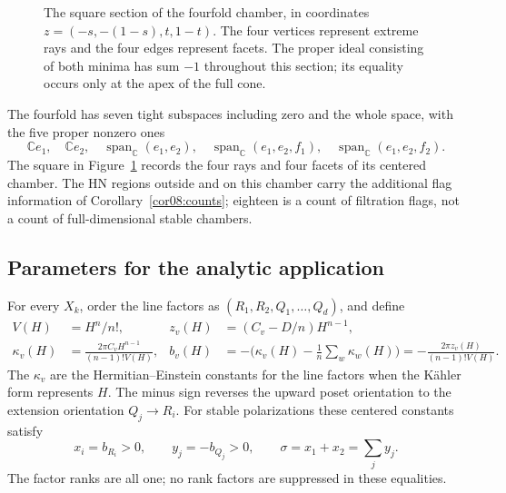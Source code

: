 \documentclass[11pt]{amsart}
\theoremstyle{definition}
\theoremstyle{remark}
\newcommand{\CC}{\mathbb C}
\newcommand{\spanC}{\operatorname{span}_{\CC}}
\begin{document}
\begin{figure}[htbp]
\centering
{}
\caption{The square section of the fourfold chamber, in coordinates
\(z=(-s,-(1-s),t,1-t)\). The four vertices represent extreme rays
and the four edges represent facets. The proper ideal consisting of
both minima has sum \(-1\) throughout this section; its equality
occurs only at the apex of the full cone.}
\label{fig09:square}
\end{figure}


The fourfold has seven tight subspaces including zero and the whole
space, with the five proper nonzero ones
\[
 \CC e_1,\quad\CC e_2,\quad
 \spanC(e_1,e_2),\quad
 \spanC(e_1,e_2,f_1),\quad\spanC(e_1,e_2,f_2).
\]
The square in Figure~\ref{fig09:square} records the four rays and
four facets of its centered chamber. The HN regions outside and on
this chamber carry the additional flag information of
Corollary~\ref{cor08:counts}; eighteen is a count of filtration
flags, not a count of full-dimensional stable chambers.

\subsection*{Parameters for the analytic application}
For every \(X_k\), order the line factors as
\((R_1,R_2,Q_1,\ldots,Q_d)\), and define
\begin{equation}\label{eq09:demands}
 \begin{aligned}
 V(H)&=H^n/n!,&
 z_v(H)&=(C_v-D/n)H^{n-1},\\
 \kappa_v(H)&=\frac{2\pi C_vH^{n-1}}{(n-1)!V(H)},&
 b_v(H)&=-\biggl(\kappa_v(H)-\frac1n\sum_w\kappa_w(H)\biggr)
       =-\frac{2\pi z_v(H)}{(n-1)!V(H)}.
 \end{aligned}
\end{equation}
The \(\kappa_v\) are the Hermitian--Einstein constants for the line
factors when the Kähler form represents \(H\). The minus sign
reverses the upward poset orientation to the extension orientation
\(Q_j\to R_i\). For stable polarizations these centered constants satisfy
\begin{equation}\label{eq09:signs}
 x_i=b_{R_i}>0,\qquad y_j=-b_{Q_j}>0,
 \qquad\sigma=x_1+x_2=\sum_jy_j.
\end{equation}
The factor ranks are all one; no rank factors are suppressed in
these equalities.
\end{document}
